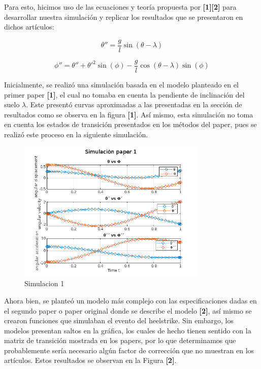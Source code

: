 \documentclass[journal,transmag]{IEEEtran}
\begin{document}
Para esto, hicimos uso de las ecuaciones y teoría propuesta por \textbf{[1]}\textbf{[2]} para desarrollar nuestra simulación y replicar los resultados que se presentaron en dichos artículos:

\begin{equation}
\theta'' = \frac{g}{l} \sin(\theta - \lambda)
\end{equation}

\begin{equation}
\phi'' = \theta'' + \theta'^2 \sin(\phi) - \frac{g}{l} \cos(\theta - \lambda) \sin(\phi)
\end{equation}

Inicialmente, se realizó una simulación basada en el modelo planteado en el primer paper \textbf{[1]}, el cual no tomaba en cuenta la pendiente de inclinación del suelo $\lambda$. Este presentó curvas aproximadas a las presentadas en la sección de resultados como se observa en la figura \textbf{[1]}. 
Así mismo, esta simulación no toma en cuenta los estados de transición presentados en los métodos del paper, pues se realizó este proceso en la siguiente simulación.

\begin{figure}[!h]
		\center
		\includegraphics[width=9cm]{imgs/s1.png}
		\caption{Simulacion 1}
		\label{1}
\end{figure}


Ahora bien, se planteó un modelo más complejo con las especificaciones dadas en el segundo paper o paper original donde se describe el modelo \textbf{[2]}, así mismo se crearon funciones que simulaban el evento del heelstrike. Sin embargo, los modelos presentan saltos en la gráfica, los cuales de hecho tienen sentido con la matriz de transición mostrada en los papers, por lo que determinamos que probablemente sería necesario algún factor de corrección que no muestran en los artículos. Estos resultados se observan en la Figura \textbf{[2]}. 
\end{document}
